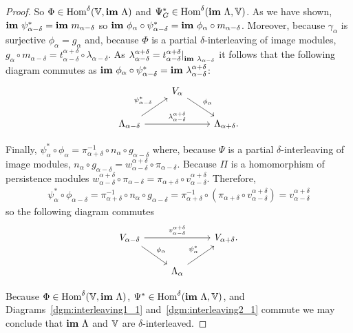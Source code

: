 \begin{proof}
  So $\Phi\in\mathrm{Hom}^\delta(\mathbb{V},\mathbf{im}~\Lambda)$ and $\Psi_G^*\in\mathrm{Hom}^\delta(\mathbf{im}~\Lambda,\mathbb{V})$.
  As we have shown, $\mathbf{im}~\psi_{\alpha-\delta}^* = \mathbf{im}~m_{\alpha-\delta}$ so $\mathbf{im}~\phi_\alpha\circ\psi_{\alpha-\delta}^* = \mathbf{im}~\phi_\alpha\circ m_{\alpha-\delta}$.
  Moreover, because $\gamma_\alpha$ is surjective $\phi_\alpha = g_\alpha$ and, because $\Phi$ is a partial $\delta$-interleaving of image modules, $g_\alpha\circ m_{\alpha-\delta} = t_{\alpha-\delta}^{\alpha+\delta}\circ \lambda_{\alpha-\delta}$.
  As $\lambda_{\alpha-\delta}^{\alpha+\delta} = t_{\alpha-\delta}^{\alpha+\delta}\mathord{\mid}_{\mathbf{im}~\lambda_{\alpha-\delta}}$ it follows that the following diagram commutes as $\mathbf{im}~\phi_\alpha\circ\psi_{\alpha-\delta}^* = \mathbf{im}~\lambda_{\alpha-\delta}^{\alpha+\delta}$:
  \begin{equation}\label{dgm:interleaving1_1}
    \begin{tikzcd}
      & V_{\alpha}\arrow{dr}{\phi_\alpha} &\\
      \Lambda_{\alpha-\delta}\arrow{rr}{\lambda_{\alpha-\delta}^{\alpha+\delta}}\arrow{ur}{\psi_{\alpha-\delta}^*} & &
      \Lambda_{\alpha+\delta}.
  \end{tikzcd}\end{equation}

  Finally, $\psi_\alpha^*\circ\phi_\alpha = \pi_{\alpha+\delta}^{-1}\circ n_\alpha\circ g_{\alpha-\delta}$ where, because $\Psi$ is a partial $\delta$-interleaving of image modules, $n_\alpha\circ g_{\alpha-\delta} = w_{\alpha-\delta}^{\alpha+\delta}\circ\pi_{\alpha-\delta}$.
  Because $\Pi$ is a homomorphism of persistence modules $w_{\alpha-\delta}^{\alpha+\delta}\circ \pi_{\alpha-\delta} = \pi_{\alpha+\delta}\circ v_{\alpha-\delta}^{\alpha+\delta}$.
  Therefore,
  \begin{align*}
    \psi_\alpha^*\circ\phi_{\alpha-\delta} = \pi_{\alpha+\delta}^{-1}\circ n_\alpha\circ g_{\alpha-\delta} = \pi_{\alpha+\delta}^{-1}\circ (\pi_{\alpha+\delta}\circ v_{\alpha-\delta}^{\alpha+\delta}) = v_{\alpha-\delta}^{\alpha+\delta}
  \end{align*}
  so the following diagram commutes
  \begin{equation}\label{dgm:interleaving2_1}
    \begin{tikzcd}
      V_{\alpha-\delta}\arrow{rr}{v_{\alpha-\delta}^{\alpha+\delta}}\arrow{dr}{\phi_\alpha} & &
      V_{\alpha+\delta}.\\
      & \Lambda_{\alpha}\arrow{ur}{\psi_\alpha^*} &
  \end{tikzcd}\end{equation}

  Because $\Phi\in\mathrm{Hom}^\delta(\mathbb{V},\mathbf{im}~\Lambda)$, $\Psi^*\in\mathrm{Hom}^\delta(\mathbf{im}~\Lambda, \mathbb{V})$, and Diagrams~\ref{dgm:interleaving1_1} and~\ref{dgm:interleaving2_1} commute we may conclude that $\mathbf{im}~\Lambda$ and $\mathbb{V}$ are $\delta$-interleaved.

\end{proof}
